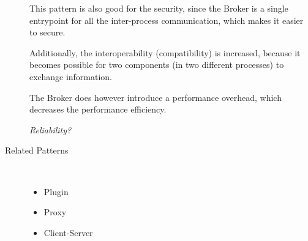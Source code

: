 \begin{description}
This pattern is also good for the security, since the Broker is a single entrypoint for all the inter-process communication, which makes it easier to secure.

Additionally, the interoperability (compatibility) is increased, because it becomes possible for two components (in two different processes) to exchange information. 

The Broker does however introduce a performance overhead, which decreases the performance efficiency.

\textit{Reliability?}


\item [Related Patterns]~
\begin{itemize}
\item Plugin
\item Proxy
\item Client-Server
\end{itemize}

\end{description}


